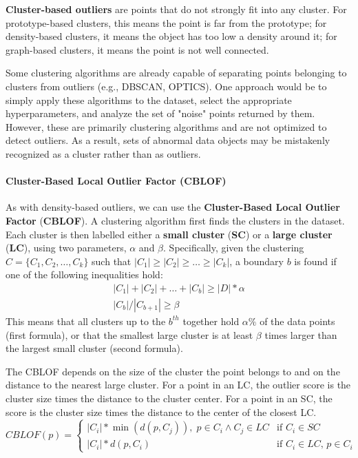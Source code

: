 \textbf{Cluster-based outliers} are points that do not strongly fit into any cluster. For prototype-based clusters, this means the point is far from the prototype; for density-based clusters, it means the object has too low a density around it; for graph-based clusters, it means the point is not well connected.

Some clustering algorithms are already capable of separating points belonging to clusters from outliers (e.g., DBSCAN, OPTICS). One approach would be to simply apply these algorithms to the dataset, select the appropriate hyperparameters, and analyze the set of "noise" points returned by them. However, these are primarily clustering algorithms and are not optimized to detect outliers. As a result, sets of abnormal data objects may be mistakenly recognized as a cluster rather than as outliers.

\paragraph{Cluster-Based Local Outlier Factor (CBLOF)}
As with density-based outliers, we can use the \textbf{Cluster-Based Local Outlier Factor} (\textbf{CBLOF}). A clustering algorithm first finds the clusters in the dataset. Each cluster is then labelled either a \textbf{small cluster} (\textbf{SC}) or a \textbf{large cluster} (\textbf{LC}), using two parameters, $\alpha$ and $\beta$. Specifically, given the clustering $C = \{C_1, C_2, \dots, C_k \}$ such that $|C_1| \geq |C_2| \geq \dots \geq |C_k|$, a boundary $b$ is found if one of the following inequalities hold:
\begin{gather*}
    |C_1| + |C_2| + \dots + |C_b| \geq |D|*\alpha \\
    |C_b|/|C_{b+1}| \geq \beta
\end{gather*}
This means that all clusters up to the $b^{th}$ together hold $\alpha \%$ of the data points (first formula), or that the smallest large cluster is at least $\beta$ times larger than the largest small cluster (second formula).

The CBLOF depends on the size of the cluster the point belongs to and on the distance to the nearest large cluster. For a point in an LC, the outlier score is the cluster size times the distance to the cluster center. For a point in an SC, the score is the cluster size times the distance to the center of the closest LC.
\begin{equation}
    CBLOF(p) = \begin{cases}
        |C_i|*\min(d(p, C_j)),\; p \in C_i \land C_j \in LC & \text{if $C_i \in SC$} \\
        |C_i|*d(p, C_i) & \text{if $C_i \in LC, \,p \in C_i$}
    \end{cases}
\end{equation}

